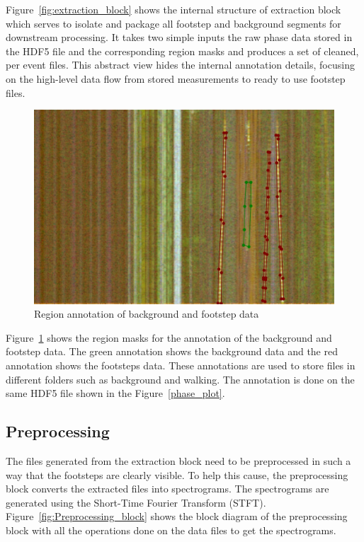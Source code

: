 Figure~\ref{fig:extraction_block} shows the internal structure of extraction block which serves to isolate and package all footstep and background segments for downstream processing. It takes two simple inputs the raw phase data stored in the HDF5 file and the corresponding region masks and produces a set of cleaned, per event files. This abstract view hides the internal annotation details, focusing on the high-level data flow from stored measurements to ready to use footstep files.

\begin{figure}[ht]
  \centering
  \includegraphics[width=\linewidth]{Bilder/jpg/labelme.jpg}
  \caption{Region annotation of background and footstep data}
  \label{labelme}
\end{figure}
 
Figure~\ref{labelme} shows the region masks for the annotation of the background and footstep data. The green annotation shows the background data and the red annotation shows the footsteps data. These annotations are used to store files in different folders such as background and walking. The annotation is done on the same HDF5 file shown in the Figure~\ref{phase_plot}.   

\subsection{Preprocessing}\label{sec:preprocessing}
The files generated from the extraction block need to be preprocessed in such a way that the footsteps are clearly visible. To help this cause, the preprocessing block converts the extracted files into spectrograms. The spectrograms are generated using the Short-Time Fourier Transform (STFT). Figure~\ref{fig:Preprocessing_block} shows the block diagram of the preprocessing block with all the operations done on the data files to get the spectrograms.

